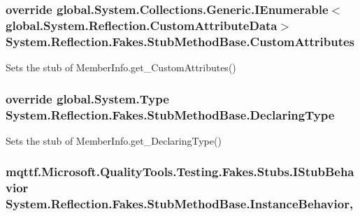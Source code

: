 \hypertarget{class_system_1_1_reflection_1_1_fakes_1_1_stub_method_base_a6249153c9623ed1f1f4b4964093458cc}{
\subsubsection[{Custom\-Attributes}]{\setlength{\rightskip}{0pt plus 5cm}override global.\-System.\-Collections.\-Generic.\-I\-Enumerable$<$global.\-System.\-Reflection.\-Custom\-Attribute\-Data$>$ System.\-Reflection.\-Fakes.\-Stub\-Method\-Base.\-Custom\-Attributes\hspace{0.3cm}{\ttfamily [get]}}}\label{class_system_1_1_reflection_1_1_fakes_1_1_stub_method_base_a6249153c9623ed1f1f4b4964093458cc}


Sets the stub of Member\-Info.\-get\-\_\-\-Custom\-Attributes()

\hypertarget{class_system_1_1_reflection_1_1_fakes_1_1_stub_method_base_ae74c1bdf2a47c7413f00867e0464f025}{
\subsubsection[{Declaring\-Type}]{\setlength{\rightskip}{0pt plus 5cm}override global.\-System.\-Type System.\-Reflection.\-Fakes.\-Stub\-Method\-Base.\-Declaring\-Type\hspace{0.3cm}{\ttfamily [get]}}}\label{class_system_1_1_reflection_1_1_fakes_1_1_stub_method_base_ae74c1bdf2a47c7413f00867e0464f025}


Sets the stub of Member\-Info.\-get\-\_\-\-Declaring\-Type()

\hypertarget{class_system_1_1_reflection_1_1_fakes_1_1_stub_method_base_a0ac0da363119151bfebfcd8170555969}{
\subsubsection[{Instance\-Behavior}]{\setlength{\rightskip}{0pt plus 5cm}mqttf.\-Microsoft.\-Quality\-Tools.\-Testing.\-Fakes.\-Stubs.\-I\-Stub\-Behavior System.\-Reflection.\-Fakes.\-Stub\-Method\-Base.\-Instance\-Behavior\hspace{0.3cm}{\ttfamily [get]}, {\ttfamily [set]}}}\label{class_system_1_1_reflection_1_1_fakes_1_1_stub_method_base_a0ac0da363119151bfebfcd8170555969}


